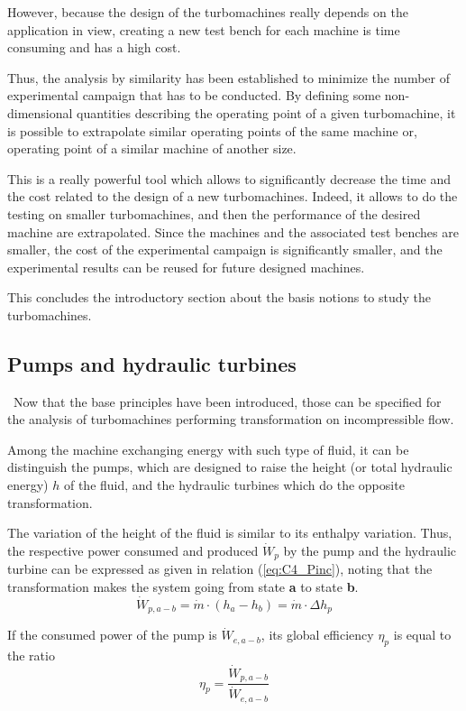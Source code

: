 However, because the design of the turbomachines really depends on the application in view, creating a new test bench for each machine is time consuming and has a high cost. 

Thus, the analysis by similarity has been established to 
minimize the number of experimental campaign that has to be conducted. By defining some non-dimensional quantities describing the operating point of a given turbomachine, it is possible to extrapolate similar operating points of the same machine or, operating point of a similar machine of another size. 

This is a really powerful tool which allows to significantly decrease the time and the cost related to the design of a new turbomachines. Indeed, it allows to do the testing on smaller turbomachines, and then the performance of the desired machine are extrapolated. Since the machines and the associated test benches are smaller, the cost of the experimental campaign is significantly smaller, and the experimental results can be reused for future designed machines.

This concludes the introductory section about the basis notions to study the turbomachines. 
\subsection{Pumps and hydraulic turbines}
\quad\, Now that the base principles have been introduced, those can be specified for the analysis of turbomachines performing transformation on incompressible flow. 

Among the machine exchanging energy with such type of fluid, it can be distinguish the pumps, which are designed to raise the height (or total hydraulic energy) \(h\) of the fluid, and the hydraulic turbines which do the opposite transformation. 

The variation of the height of the fluid is similar to its enthalpy variation. Thus, the respective power consumed and produced \(\dot{W}_p\) by  the pump and the hydraulic turbine can be expressed as given in relation (\ref{eq:C4_Pinc}), noting that the transformation makes the system going from state \textbf{a} to state \textbf{b}.
\begin{equation}
    \dot{W}_{p,a-b} = \dot{m}\cdot (h_a - h_b)=\dot{m}\cdot\Delta h_p \label{eq:C4_Pinc}
\end{equation}


If the consumed power of the pump is \(\dot{W}_{e,a-b}\), its global efficiency \(\eta_p\) is equal to the ratio
\begin{equation}
    \eta_p = \frac{\dot{W}_{p,a-b}}{\dot{W}_{e,a-b}}\label{eq:C4_Etapump}
\end{equation}
